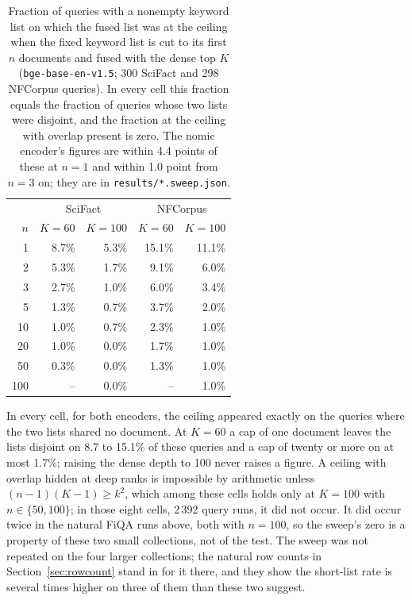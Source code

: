 \documentclass[11pt]{article}
\begin{document}
\begin{table}[h]
\centering
\small
\begin{tabular}{rrrrr}
\toprule
 & \multicolumn{2}{c}{SciFact} & \multicolumn{2}{c}{NFCorpus} \\
$n$ & $K=60$ & $K=100$ & $K=60$ & $K=100$ \\
\midrule
1 & 8.7\% & 5.3\% & 15.1\% & 11.1\% \\
2 & 5.3\% & 1.7\% & 9.1\% & 6.0\% \\
3 & 2.7\% & 1.0\% & 6.0\% & 3.4\% \\
5 & 1.3\% & 0.7\% & 3.7\% & 2.0\% \\
10 & 1.0\% & 0.7\% & 2.3\% & 1.0\% \\
20 & 1.0\% & 0.0\% & 1.7\% & 1.0\% \\
50 & 0.3\% & 0.0\% & 1.3\% & 1.0\% \\
100 & -- & 0.0\% & -- & 1.0\% \\
\bottomrule
\end{tabular}
\caption{Fraction of queries with a nonempty keyword list on which the fused list was at the ceiling when the fixed keyword list is cut to its first $n$ documents and fused with the dense top $K$ (\texttt{bge-base-en-v1.5}; 300 SciFact and 298 NFCorpus queries). In every cell this fraction equals the fraction of queries whose two lists were disjoint, and the fraction at the ceiling with overlap present is zero. The nomic encoder's figures are within 4.4 points of these at $n=1$ and within 1.0 point from $n=3$ on; they are in \texttt{results/*.sweep.json}.}
\label{tab:sweep}
\end{table}

In every cell, for both encoders, the ceiling appeared exactly on the queries where the two lists shared no document. At $K = 60$ a cap of one document leaves the lists disjoint on 8.7 to 15.1\% of these queries and a cap of twenty or more on at most 1.7\%; raising the dense depth to 100 never raises a figure. A ceiling with overlap hidden at deep ranks is impossible by arithmetic unless $(n-1)(K-1) \ge k^2$, which among these cells holds only at $K = 100$ with $n \in \{50, 100\}$; in those eight cells, 2\,392 query runs, it did not occur. It did occur twice in the natural FiQA runs above, both with $n = 100$, so the sweep's zero is a property of these two small collections, not of the test. The sweep was not repeated on the four larger collections; the natural row counts in Section~\ref{sec:rowcount} stand in for it there, and they show the short-list rate is several times higher on three of them than these two suggest.
\end{document}
